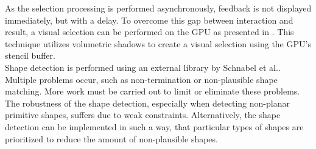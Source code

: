 As the selection processing is performed asynchronously, feedback is not displayed immediately, but with a delay. To overcome this gap between interaction and result, a visual selection can be performed on the GPU as presented in \cite{rainer2016visual}. This technique utilizes volumetric shadows to create a visual selection using the GPU's stencil buffer. 
\\

Shape detection is performed using an external library by Schnabel et al.\cite{schnabel-2007-software}. Multiple problems occur, such as non-termination or non-plausible shape matching. More work must be carried out to limit or eliminate these problems. The robustness of the shape detection, especially when detecting non-planar primitive shapes, suffers due to weak constraints. Alternatively, the shape detection can be implemented in such a way, that particular types of shapes are prioritized to reduce the amount of non-plausible shapes. 
\\

